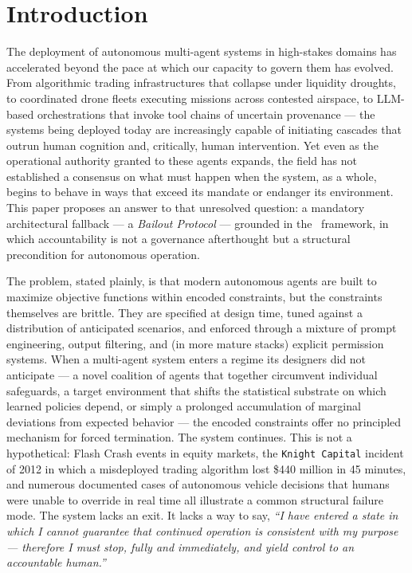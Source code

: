 \section{Introduction}

The deployment of autonomous multi-agent systems in high-stakes domains has accelerated beyond the pace at which our capacity to govern them has evolved. From algorithmic trading infrastructures that collapse under liquidity droughts, to coordinated drone fleets executing missions across contested airspace, to LLM-based orchestrations that invoke tool chains of uncertain provenance — the systems being deployed today are increasingly capable of initiating cascades that outrun human cognition and, critically, human intervention. Yet even as the operational authority granted to these agents expands, the field has not established a consensus on what must happen when the system, as a whole, begins to behave in ways that exceed its mandate or endanger its environment. This paper proposes an answer to that unresolved question: a mandatory architectural fallback — a \emph{Bailout Protocol} — grounded in the \bxthree\ framework, in which accountability is not a governance afterthought but a structural precondition for autonomous operation.

The problem, stated plainly, is that modern autonomous agents are built to maximize objective functions within encoded constraints, but the constraints themselves are brittle. They are specified at design time, tuned against a distribution of anticipated scenarios, and enforced through a mixture of prompt engineering, output filtering, and (in more mature stacks) explicit permission systems. When a multi-agent system enters a regime its designers did not anticipate — a novel coalition of agents that together circumvent individual safeguards, a target environment that shifts the statistical substrate on which learned policies depend, or simply a prolonged accumulation of marginal deviations from expected behavior — the encoded constraints offer no principled mechanism for forced termination. The system continues. This is not a hypothetical: Flash Crash events in equity markets, the \texttt{Knight Capital} incident of 2012 in which a misdeployed trading algorithm lost \$440 million in 45 minutes, and numerous documented cases of autonomous vehicle decisions that humans were unable to override in real time all illustrate a common structural failure mode. The system lacks an exit. It lacks a way to say, \emph{``I have entered a state in which I cannot guarantee that continued operation is consistent with my purpose — therefore I must stop, fully and immediately, and yield control to an accountable human.''}

